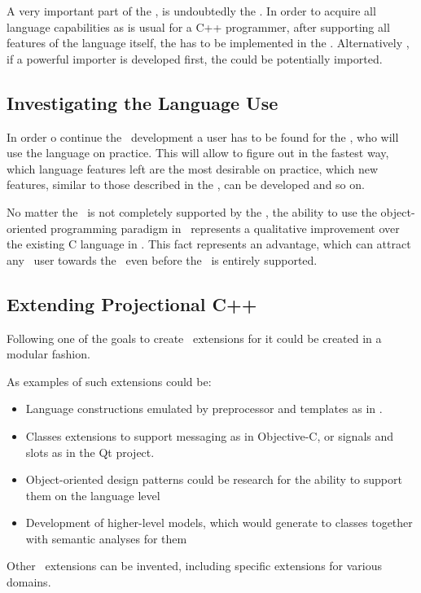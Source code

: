 A very important part of the \cpppl, is undoubtedly  the . In order to acquire
all language capabilities as is usual for a C++ programmer, after supporting all features
of the language itself, the  has to be implemented in the \pcpp. Alternatively , if a powerful
importer is developed first, the  could be potentially imported. 

\subsection{Investigating the Language Use}

In order o continue the \pcpp\ development a user has to be found for the \pcpp, who
will use the language on practice. This will allow to figure out in the fastest way,
which language features left are the most desirable on practice, which new features,
similar to those described in the , can be developed and so on.

No matter the \cpppl\ is not completely supported by the \pcpp, the ability to use the
object-oriented programming paradigm in \mbdr\ represents a qualitative improvement over
the existing C language in \mbdr. This fact represents an advantage, which can
attract any \mbdr\ user towards the \pcpp\ even before the \cpppl\ is entirely supported.

\subsection{Extending Projectional C++}

Following one of the goals to create \pcpp\ extensions for it could be created in a 
modular fashion.

As examples of such extensions could be:
\begin{itemize}
 \item Language constructions emulated by preprocessor and templates as in \cite{alexandrescumeta}.
 \item Classes extensions to support messaging as in Objective-C, or signals and slots as in the Qt project.
 \item Object-oriented design patterns could be research for the ability to support them on the 
 language level
 \item Development of higher-level models, which would generate to classes together with semantic analyses for them
\end{itemize}

Other \pcpp\ extensions can be invented, including specific extensions for various domains.


